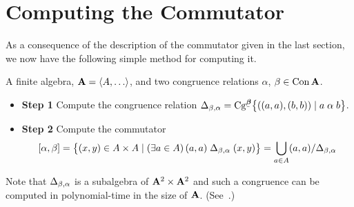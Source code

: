 \section{Computing the Commutator}
As a consequence of the description of the commutator given in the last section,
we now have the following simple method for computing it.

\smallskip

 \hskip2mm A finite algebra, $\bA = \<A, \dots\>$, and two congruence relations $\alpha$, $\beta \in \operatorname{Con} \mathbf{A}$.

\smallskip
{}
\begin{itemize}
\item {\bf Step 1} \hskip2mm Compute the congruence relation
  $\Deltaba = \Cg^{\bbeta}\bigl\{((a,a), (b,b)) \mid a \alphar b \bigr\}$.
\item {\bf Step 2} \hskip2mm Compute the commutator
  \[[\alpha, \beta] 
  = \bigl\{(x,y) \in A\times A \mid (\exists a \in A) \, (a,a) \mathrel{\Delta_{\beta, \alpha}} (x,y)\bigr\} 
  =\bigcup_{a\in A} (a,a)/\Delta_{\beta, \alpha}
    \]
\end{itemize}
Note that $\Delta_{\beta, \alpha}$ is a subalgebra of $\mathbf{A}^2 \times \mathbf{A}^2$ and such a congruence
can be computed in polynomial-time in the size of $\mathbf{A}$. (See~\cite{MR2470585}.)









